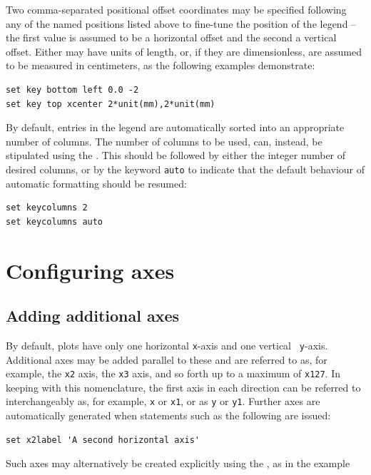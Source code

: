 Two comma-separated positional offset coordinates may be specified following
any of the named positions listed above to fine-tune the position of the legend
-- the first value is assumed to be a horizontal offset and the second a
vertical offset. Either may have units of length, or, if they are
dimensionless, are assumed to be measured in centimeters, as the following
examples demonstrate:

\begin{verbatim}
set key bottom left 0.0 -2
set key top xcenter 2*unit(mm),2*unit(mm)
\end{verbatim}

By default, entries in the legend are automatically sorted into an appropriate
number of columns. The number of columns to be used, can, instead, be
stipulated using the . This should be followed by
either the integer number of desired columns, or by the keyword {\tt auto} to
indicate that the default behaviour of automatic formatting should be resumed:

\begin{verbatim}
set keycolumns 2
set keycolumns auto
\end{verbatim}

\section{Configuring axes}

\subsection{Adding additional axes}
\label{sec:multiple_axes}

By default, plots have only one horizontal {\tt x}-axis and one vertical {\tt
y}-axis.  Additional axes may be added parallel to these and are referred to
as, for example, the {\tt x2} axis, the {\tt x3} axis, and so forth up to a
maximum of {\tt x127}.  In keeping with this nomenclature, the first axis in
each direction can be referred to interchangeably as, for example, {\tt x} or
{\tt x1}, or as {\tt y} or {\tt y1}.  Further axes are automatically generated
when statements such as the following are issued:

\begin{verbatim}
set x2label 'A second horizontal axis'
\end{verbatim}

\noindent Such axes may alternatively be created explicitly using the
, as in the example

